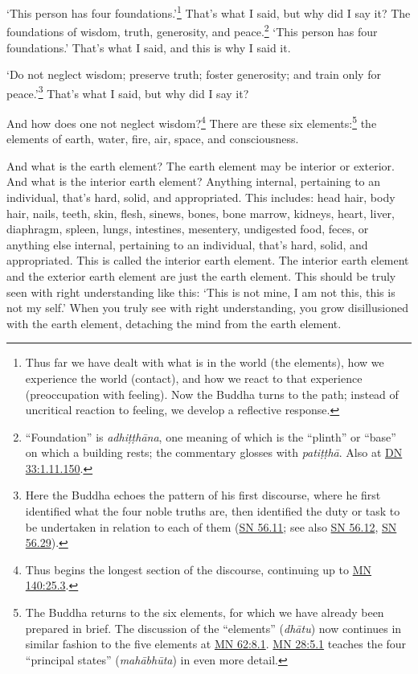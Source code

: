 \documentclass[12pt,openany]{book}%
\begin{document}
‘This person has four foundations.’\footnote{Thus far we have dealt with what is in the world (the elements), how we experience the world (contact), and how we react to that experience (preoccupation with feeling). Now the Buddha turns to the path; instead of uncritical reaction to feeling, we develop a reflective response. } That’s what I said, but why did I say it? The foundations of wisdom, truth, generosity, and peace.\footnote{“Foundation” is \textit{\textsanskrit{adhiṭṭhāna}}, one meaning of which is the “plinth” or “base” on which a building rests; the commentary glosses with \textit{\textsanskrit{patiṭṭhā}}. Also at \href{https://suttacentral.net/dn33/en/sujato\#1.11.150}{DN 33:1.11.150}. } ‘This person has four foundations.’ That’s what I said, and this is why I said it. 

‘Do not neglect wisdom; preserve truth; foster generosity; and train only for peace.’\footnote{Here the Buddha echoes the pattern of his first discourse, where he first identified what the four noble truths are, then identified the duty or task to be undertaken in relation to each of them (\href{https://suttacentral.net/sn56.11/en/sujato}{SN 56.11}; see also \href{https://suttacentral.net/sn56.12/en/sujato}{SN 56.12}, \href{https://suttacentral.net/sn56.29/en/sujato}{SN 56.29}). } That’s what I said, but why did I say it? 

And how does one not neglect wisdom?\footnote{Thus begins the longest section of the discourse, continuing up to \href{https://suttacentral.net/mn140/en/sujato\#25.3}{MN 140:25.3}. } There are these six elements:\footnote{The Buddha returns to the six elements, for which we have already been prepared in brief. The discussion of the “elements” (\textit{\textsanskrit{dhātu}}) now continues in similar fashion to the five elements at \href{https://suttacentral.net/mn62/en/sujato\#8.1}{MN 62:8.1}. \href{https://suttacentral.net/mn28/en/sujato\#5.1}{MN 28:5.1} teaches the four “principal states” (\textit{\textsanskrit{mahābhūta}}) in even more detail. } the elements of earth, water, fire, air, space, and consciousness. 

And what is the earth element? The earth element may be interior or exterior. And what is the interior earth element? Anything internal, pertaining to an individual, that’s hard, solid, and appropriated. This includes: head hair, body hair, nails, teeth, skin, flesh, sinews, bones, bone marrow, kidneys, heart, liver, diaphragm, spleen, lungs, intestines, mesentery, undigested food, feces, or anything else internal, pertaining to an individual, that’s hard, solid, and appropriated. This is called the interior earth element. The interior earth element and the exterior earth element are just the earth element. This should be truly seen with right understanding like this: ‘This is not mine, I am not this, this is not my self.’ When you truly see with right understanding, you grow disillusioned with the earth element, detaching the mind from the earth element. 
\end{document}
